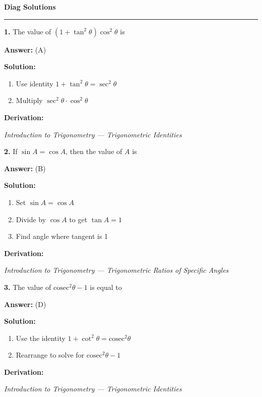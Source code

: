 \documentclass[12pt,a4paper]{exam}
\newcommand{\fitmath}[1]{%
  \sbox{\schmathbox}{$\displaystyle #1$}%
  \ifdim\wd\schmathbox>\linewidth
    \resizebox{\linewidth}{!}{\usebox{\schmathbox}}%
  \else
    \usebox{\schmathbox}%
  \fi}
\begin{document}
\thispagestyle{empty}
\begin{center}
  \textbf{\LARGE Diag Solutions} \\[0.3cm]
  \rule{\textwidth}{0.5pt}
\end{center}

\vspace{0.3cm}

\begin{questions}
\question \textbf{1.} The value of $(1 + \tan^2 \theta) \cos^2 \theta$ is

\textbf{Answer:}
(A)

\textbf{Solution:}
\begin{enumerate}
  \item Use identity $1 + \tan^2 \theta = \sec^2 \theta$
  \item Multiply $\sec^2 \theta \cdot \cos^2 \theta$
\end{enumerate}
\textbf{Derivation:}
\begin{center}
\fitmath{\sec^2 \theta \cdot \cos^2 \theta = \frac{1}{\cos^2 \theta} \cdot \cos^2 \theta = 1}
\end{center}
\hfill \textit{Introduction to Trigonometry — Trigonometric Identities}
\vspace{0.3cm}

\question \textbf{2.} If $\sin A = \cos A$, then the value of $A$ is

\textbf{Answer:}
(B)

\textbf{Solution:}
\begin{enumerate}
  \item Set $\sin A = \cos A$
  \item Divide by $\cos A$ to get $\tan A = 1$
  \item Find angle where tangent is 1
\end{enumerate}
\textbf{Derivation:}
\begin{center}
\fitmath{\begin{aligned}
\tan A = 1 \\
\implies A = 45^\circ
\end{aligned}}
\end{center}
\hfill \textit{Introduction to Trigonometry — Trigonometric Ratios of Specific Angles}
\vspace{0.3cm}

\question \textbf{3.} The value of $\text{cosec}^2 \theta - 1$ is equal to

\textbf{Answer:}
(D)

\textbf{Solution:}
\begin{enumerate}
  \item Use the identity $1 + \cot^2 \theta = \text{cosec}^2 \theta$
  \item Rearrange to solve for $\text{cosec}^2 \theta - 1$
\end{enumerate}
\textbf{Derivation:}
\begin{center}
\fitmath{\text{cosec}^2 \theta - 1 = \cot^2 \theta}
\end{center}
\hfill \textit{Introduction to Trigonometry — Trigonometric Identities}
\vspace{0.3cm}


\end{questions}
\end{document}
